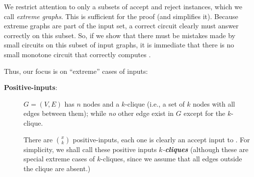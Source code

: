 We  restrict attention to only a subsets of accept and reject instances, which we call \emph{extreme graphs}. This is sufficient for the proof (and simplifies it). 
Because extreme graphs are part of the input set, a correct circuit clearly must answer correctly on this subset. So, if we show that there must be mistakes made by small circuits on this subset of input graphs, it is immediate that there is no small monotone circuit that correctly computes \cliquenk.



Thus, our focus is on ``extreme'' cases of inputs:

\begin{description}
\item[\textbf{Positive-inputs}:] 
 $G=(V,E)$ has $n$ nodes and a $k$-clique (i.e., a set of $k$ nodes with all edges between them); while \emph{no} other edge exist in $G$ except for the $k$-clique.

There are $\binom{x}{k}$ positive-inputs, each one is clearly an accept input to \cliquenk.
For simplicity, we shall call these positive inputs \emph{$k$-\textbf{cliques}} (although these are special extreme cases of $k$-cliques, since we assume that all edges outside the clique are absent.) 


 
\begin{figure}[H]
    \centering
    
    
\end{figure}
\end{description}
